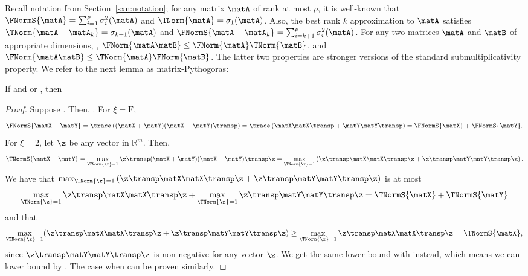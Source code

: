 Recall notation from Section~\ref{sxn:notation}; for any matrix $\matA$ of rank at most $\rho$, it is well-known that $ \FNormS{\matA} = \sum_{i=1}^\rho\sigma_i^2(\matA) $ and $\TNorm{\matA} = \sigma_1(\matA)$. Also, the best rank $k$ approximation to $\matA$ satisfies $\TNorm{\matA-\matA_k} = \sigma_{k+1}(\matA)$ and $\FNormS{\matA-\matA_k} = \sum_{i=k+1}^{\rho}\sigma_{i}^2(\matA)$. For any two matrices $\matA$ and $\matB$ of appropriate dimensions, \math{\TNorm{\matA}\le\FNorm{\matA}\le\sqrt{\rho}\TNorm{\matA}}, $\FNorm{\matA\matB} \leq \FNorm{\matA}\TNorm{\matB}$, and $ \FNorm{\matA\matB} \leq \TNorm{\matA} \FNorm{\matB}$. The latter two properties are stronger versions of the standard submultiplicativity property. We refer to the next lemma as matrix-Pythogoras:
\begin{lemma}\label{lem:pyth}
If  and
 or , then
\end{lemma}
\begin{proof}
Suppose .
Then, \math{(\matX+\matY)(\matX+\matY)\transp=\matX\matX\transp + \matY\matY\transp}.
For $\xi = \mathrm{F}$,
$$
\FNormS{\matX + \matY}
= \trace\left((\matX+\matY)(\matX+\matY)\transp\right)
= \trace\left(\matX\matX\transp + \matY\matY\transp\right) = \FNormS{\matX} + \FNormS{\matY}.
$$
For $\xi=2$, let $\z$ be any vector in $\mathbb{R}^m$. Then,
$$
\TNormS{\matX+\matY}
= \max_{\TNorm{\z}=1}\z\transp (\matX+\matY)(\matX+\matY)\transp \z = \max_{\TNorm{\z}=1}\left( \z\transp\matX\matX\transp \z +
\z\transp\matY\matY\transp \z\right).
$$
We have that
$ \max_{\TNorm{\z}=1}\left( \z\transp\matX\matX\transp \z + \z\transp\matY\matY\transp \z\right)$ is at most
$$
\max_{\TNorm{\z}=1}\z\transp\matX\matX\transp \z +\max_{\TNorm{\z}=1}\z\transp\matY\matY\transp \z
= \TNormS{\matX} + \TNormS{\matY}
$$
and that
$$
\max_{\TNorm{\z}=1}( \z\transp\matX\matX\transp \z + \z\transp\matY\matY\transp \z)
\geq
\max_{\TNorm{\z}=1} \z\transp\matX\matX\transp \z
=
\TNormS{\matX},$$
since $\z\transp\matY\matY\transp \z$ is non-negative for any vector $\z$.
We get the same lower bound with \math{\TNormS{\matY}} instead, which means
we can lower bound by \math{\max\{\TNormS{\matX},\TNormS{\matY}\}}.
The case when  can be proven similarly.
\end{proof}

